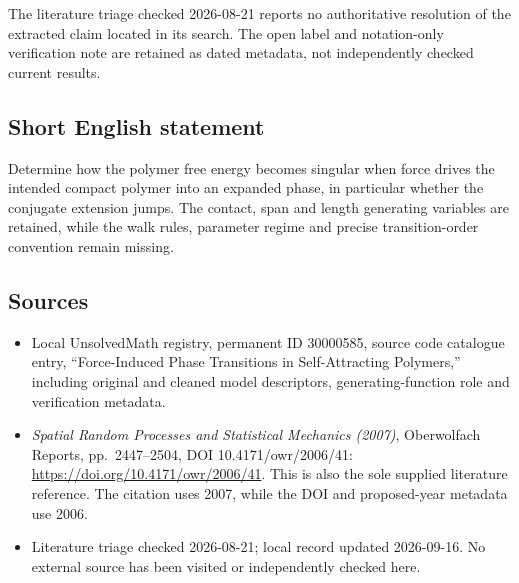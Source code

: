 \documentclass[11pt]{article}
\begin{document}
The literature triage checked 2026-08-21 reports no authoritative resolution of the extracted claim located in its search. The open label and notation-only verification note are retained as dated metadata, not independently checked current results.
\subsection{Short English statement}
Determine how the polymer free energy becomes singular when force drives the intended compact polymer into an expanded phase, in particular whether the conjugate extension jumps. The contact, span and length generating variables are retained, while the walk rules, parameter regime and precise transition-order convention remain missing.
\subsection{Sources}
\begin{itemize}
\item Local UnsolvedMath registry, permanent ID 30000585, source code catalogue entry, ``Force-Induced Phase Transitions in Self-Attracting Polymers,'' including original and cleaned model descriptors, generating-function role and verification metadata.
\item \emph{Spatial Random Processes and Statistical Mechanics (2007)}, Oberwolfach Reports, pp.\ 2447--2504, DOI 10.4171/owr/2006/41: \url{https://doi.org/10.4171/owr/2006/41}. This is also the sole supplied literature reference. The citation uses 2007, while the DOI and proposed-year metadata use 2006.
\item Literature triage checked 2026-08-21; local record updated 2026-09-16. No external source has been visited or independently checked here.
\end{itemize}
\end{document}
